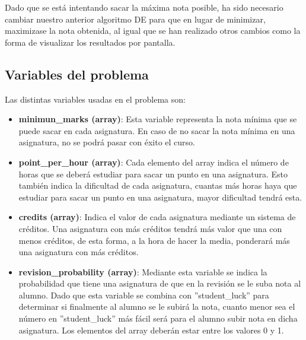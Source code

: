 \documentclass[11pt, a4paper, titlepage]{article}
\begin{document}
Dado que se está intentando sacar la máxima nota posible, ha sido necesario cambiar nuestro anterior algoritmo DE para que en lugar de minimizar, maximizase la nota obtenida, al igual que se han realizado otros cambios como la forma de visualizar los resultados por pantalla.

\subsection{Variables del problema}
Las distintas variables usadas en el problema son:

\vspace{5mm}

\begin{itemize}
\renewcommand{\labelitemi}{$\circ$}

\item \textbf{minimun\_marks (array)}: Esta variable representa la nota mínima que se puede sacar en cada asignatura. En caso de no sacar la nota mínima en una asignatura, no se podrá pasar con éxito el curso.

\vspace{5mm}

\item \textbf{point\_per\_hour (array)}: Cada elemento del array indica el número de horas que se deberá estudiar para sacar un punto en una asignatura. Esto también indica la dificultad de cada asignatura, cuantas más horas haya que estudiar para sacar un punto en una asignatura, mayor dificultad tendrá esta.

\vspace{5mm}

\item \textbf{credits (array)}: Indica el valor de cada asignatura mediante un sistema de créditos. Una asignatura con más créditos tendrá más valor que una con menos créditos, de esta forma, a la hora de hacer la media, ponderará más una asignatura con más créditos.

\vspace{5mm}

\item \textbf{revision\_probability (array)}: Mediante esta variable se indica la probabilidad que tiene una asignatura de que en la revisión se le suba nota al alumno. Dado que esta variable se combina con ''student\_luck'' para determinar si finalmente al alumno se le subirá la nota, cuanto menor sea el número en ''student\_luck'' más fácil será para el alumno subir nota en dicha asignatura. Los elementos del array deberán estar entre los valores 0 y 1.


\end{itemize}
\end{document}
